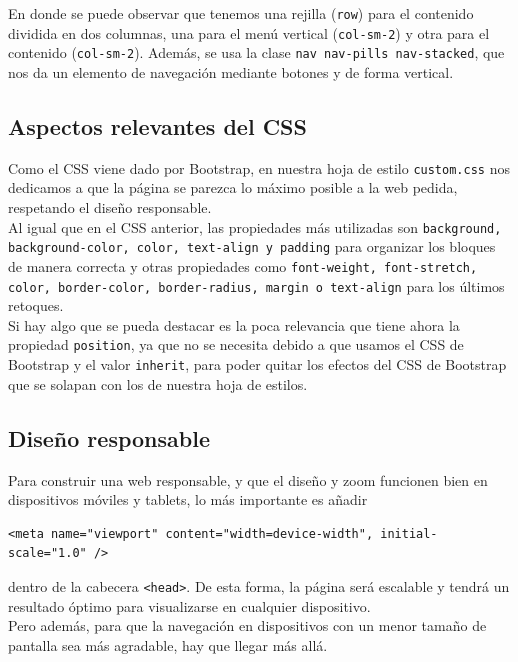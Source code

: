 \documentclass[10pt,a4paper]{article}
\begin{document}
En donde se puede observar que tenemos una rejilla (\texttt{row}) para el contenido dividida en dos columnas, una para el menú vertical (\texttt{col-sm-2}) y otra para el contenido (\texttt{col-sm-2}).
Además, se usa la clase \texttt{nav nav-pills nav-stacked}, que nos da un elemento de navegación mediante botones y de forma vertical.


\subsection{Aspectos relevantes del CSS}
Como el CSS viene dado por Bootstrap, en nuestra hoja de estilo \texttt{custom.css} nos dedicamos a que la página se parezca lo máximo posible a la web pedida, respetando el diseño responsable.\\

Al igual que en el CSS anterior, las propiedades más utilizadas son \texttt{background, background-color, color, text-align y padding} para organizar los bloques de manera correcta y otras propiedades como \texttt{font-weight, font-stretch, color, border-color, border-radius, margin o text-align} para los últimos retoques.\\

Si hay algo que se pueda destacar es la poca relevancia que tiene ahora la propiedad \texttt{position}, ya que no se necesita debido a que usamos el CSS de Bootstrap y el valor \texttt{inherit}, para poder quitar los efectos del CSS de Bootstrap que se solapan con los de nuestra hoja de estilos.

\subsection{Diseño responsable}

Para construir una web responsable, y que el diseño y zoom funcionen bien en dispositivos móviles y tablets, lo más importante es añadir  \begin{verbatim}
<meta name="viewport" content="width=device-width", initial-scale="1.0" />
\end{verbatim} dentro de la cabecera \texttt{<head>}.
De esta forma, la página será escalable y tendrá un resultado óptimo para visualizarse en cualquier dispositivo.\\

Pero además, para que la navegación en dispositivos con un menor tamaño de pantalla sea más agradable, hay que llegar más allá.\\
\end{document}
